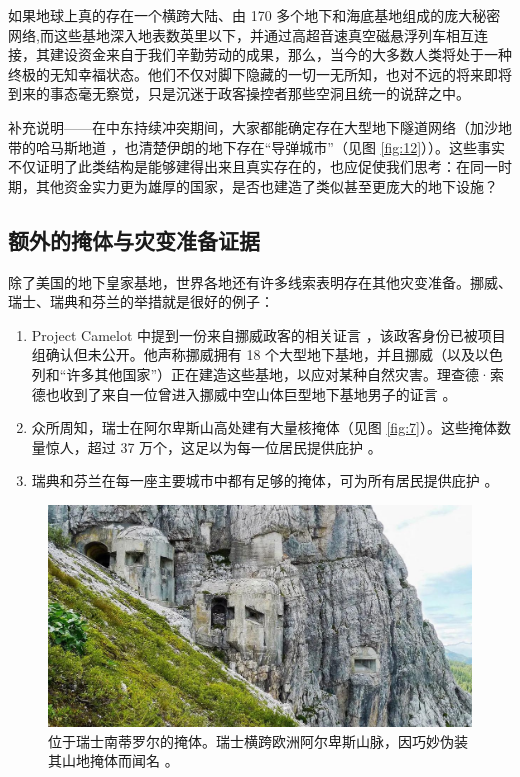 \documentclass[10pt,twocolumn,letterpaper]{article}
\begin{document}
如果地球上真的存在一个横跨大陆、由 170 多个地下和海底基地组成的庞大秘密网络,而这些基地深入地表数英里以下，并通过高超音速真空磁悬浮列车相互连接，其建设资金来自于我们辛勤劳动的成果，那么，当今的大多数人类将处于一种终极的无知幸福状态。他们不仅对脚下隐藏的一切一无所知，也对不远的将来即将到来的事态毫无察觉，只是沉迷于政客操控者那些空洞且统一的说辞之中。

补充说明——在中东持续冲突期间，大家都能确定存在大型地下隧道网络（加沙地带的哈马斯地道 \cite{38}，也清楚伊朗的地下存在“导弹城市”（见图 \ref{fig:12}）\cite{39,40}）。这些事实不仅证明了此类结构是能够建得出来且真实存在的，也应促使我们思考：在同一时期，其他资金实力更为雄厚的国家，是否也建造了类似甚至更庞大的地下设施？

\subsection{额外的掩体与灾变准备证据}

除了美国的地下皇家基地，世界各地还有许多线索表明存在其他灾变准备。挪威、瑞士、瑞典和芬兰的举措就是很好的例子：

\begin{flushleft}
\begin{enumerate}
    \item Project Camelot 中提到一份来自挪威政客的相关证言 \cite{25,26}，该政客身份已被项目组确认但未公开。他声称挪威拥有 18 个大型地下基地，并且挪威（以及以色列和“许多其他国家”）正在建造这些基地，以应对某种自然灾害。理查德·索德也收到了来自一位曾进入挪威中空山体巨型地下基地男子的证言 \cite{22}。
    \item 众所周知，瑞士在阿尔卑斯山高处建有大量核掩体（见图 \ref{fig:7}）。这些掩体数量惊人，超过 37 万个，这足以为每一位居民提供庇护 \cite{27}。
    \item 瑞典和芬兰在每一座主要城市中都有足够的掩体，可为所有居民提供庇护 \cite{27}。
\end{enumerate}
\end{flushleft}

\begin{figure}[t]
\begin{center}
   \includegraphics[width=1\linewidth]{tyrol.jpg}
\end{center}
\caption{位于瑞士南蒂罗尔的掩体。瑞士横跨欧洲阿尔卑斯山脉，因巧妙伪装其山地掩体而闻名 \cite{32}。}
\label{fig:7}
\label{fig:onecol}
\end{figure}
\end{document}
